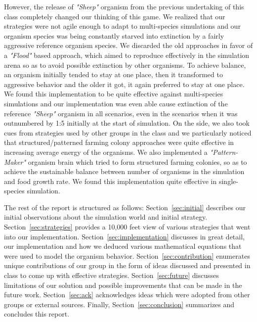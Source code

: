 However, the release of {\em "Sheep"} organism from the previous 
undertaking of this class completely changed our thinking of this game. 
We realized that our strategies were not agile enough to adapt to 
multi-species simulations and our organism species was being constantly 
starved into extinction by a fairly aggressive reference organism species. 
We discarded the old approaches in favor of a {\em "Flood"} based 
approach, which aimed to reproduce effectively in the simulation arena so as 
to avoid possible extinction by other organisms. To achieve balance, an 
organism initially tended to stay at one place, then it transformed to 
aggressive behavior and the older it got, it again preferred to stay at one 
place. 
We found this implementation to be quite effective against multi-species 
simulations and our implementation was even able cause extinction of the 
reference {\em "Sheep"} organism in all scenarios, even in the scenarios 
when it was outnumbered by 1:5 initially at the start of simulation.
On the side, we also took cues from strategies used by other groups in the 
class and we particularly noticed that structured/patterned farming colony 
approaches were quite effective in increasing average energy of the 
organisms. We also implemented a {\em "Pattern-Maker"} organism brain which 
tried to form structured farming colonies, so as to achieve the sustainable 
balance between number of organisms in the simulation and food growth rate. 
We found this implementation quite effective in single-species simulation. 

The rest of the report is structured as follows: Section~\ref{sec:initial} 
describes our initial observations about the simulation world and initial strategy. 
Section~\ref{sec:strategies} provides a 10,000 feet view of various strategies 
that went into our implementation. Section~\ref{sec:implementation} discusses in 
great detail, our implementation and how we deduced various mathematical equations 
that were used to model the organism behavior. Section~\ref{sec:contribution} 
enumerates unique contributions of our group in the form of ideas discussed and 
presented in class to come up with effective strategies. Section~\ref{sec:future} 
discusses limitations of our solution and possible improvements that can be made in 
the future work. Section~\ref{sec:ack} acknowledges ideas which were adopted 
from other groups or external sources. Finally, Section~\ref{sec:conclusion} 
summarizes and concludes this report.
